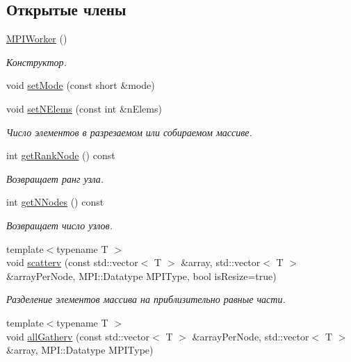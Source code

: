\subsection*{Открытые члены}
\begin{DoxyCompactItemize}
\item 
\hyperlink{classmpiworker_1_1MPIWorker_a4c6b9d1a46edd8a52cf750974975cbea}{M\-P\-I\-Worker} ()
\begin{DoxyCompactList}\small\item\em Конструктор. \end{DoxyCompactList}\item 
void \hyperlink{classmpiworker_1_1MPIWorker_a2ff88f266efae23ec2a12a56bd0472d1}{set\-Mode} (const short \&mode)
\item 
void \hyperlink{classmpiworker_1_1MPIWorker_afcce321227c6d15a5fc2145cf59cd54d}{set\-N\-Elems} (const int \&n\-Elems)
\begin{DoxyCompactList}\small\item\em Число элементов в разрезаемом или собираемом массиве. \end{DoxyCompactList}\item 
int \hyperlink{classmpiworker_1_1MPIWorker_acbd3bd07d15ffa90a2c112edeecee6e0}{get\-Rank\-Node} () const 
\begin{DoxyCompactList}\small\item\em Возвращает ранг узла. \end{DoxyCompactList}\item 
int \hyperlink{classmpiworker_1_1MPIWorker_aeeb08c56600799093b3b9da60d337896}{get\-N\-Nodes} () const 
\begin{DoxyCompactList}\small\item\em Возвращает число узлов. \end{DoxyCompactList}\item 
{\footnotesize template$<$typename T $>$ }\\void \hyperlink{classmpiworker_1_1MPIWorker_a24f713941043ab8d54574830a251995b}{scatterv} (const std\-::vector$<$ T $>$ \&array, std\-::vector$<$ T $>$ \&array\-Per\-Node, M\-P\-I\-::\-Datatype M\-P\-I\-Type, bool is\-Resize=true)
\begin{DoxyCompactList}\small\item\em Разделение элементов массива на приблизительно равные части. \end{DoxyCompactList}\item 
{\footnotesize template$<$typename T $>$ }\\void \hyperlink{classmpiworker_1_1MPIWorker_a49fda2aa379265e74f9b7504ad67ee9a}{all\-Gatherv} (const std\-::vector$<$ T $>$ \&array\-Per\-Node, std\-::vector$<$ T $>$ \&array, M\-P\-I\-::\-Datatype M\-P\-I\-Type)

\end{DoxyCompactItemize}
